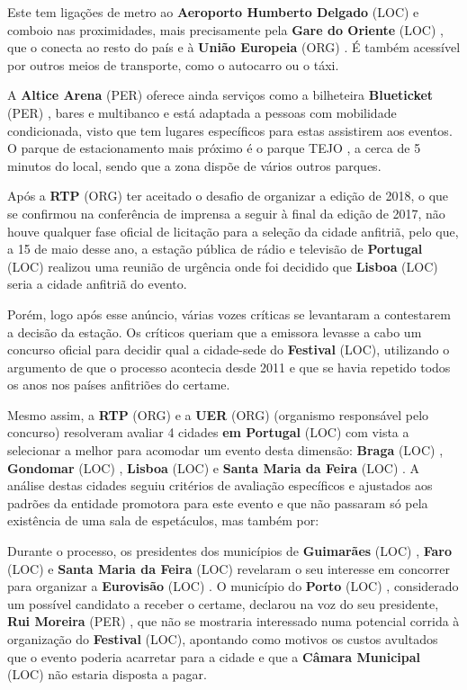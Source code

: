 \documentclass[12pt,a4paper]{article}
\begin{document}
Este tem ligações de metro ao \textbf{Aeroporto Humberto Delgado} (LOC) e comboio nas proximidades, mais precisamente pela \textbf{Gare do Oriente} (LOC) , que o conecta ao resto do país e à \textbf{União Europeia} (ORG) . É também acessível por outros meios de transporte, como o autocarro ou o táxi.

A \textbf{Altice Arena} (PER) oferece ainda serviços como a bilheteira \textbf{Blueticket} (PER) , bares e multibanco e está adaptada a pessoas com mobilidade condicionada, visto que tem lugares específicos para estas assistirem aos eventos. O parque de estacionamento mais próximo é o parque TEJO , a cerca de 5 minutos do local, sendo que a zona dispõe de vários outros parques.

Após a \textbf{RTP} (ORG) ter aceitado o desafio de organizar a edição de 2018, o que se confirmou na conferência de imprensa a seguir à final da edição de 2017, não houve qualquer fase oficial de licitação para a seleção da cidade anfitriã, pelo que, a 15 de maio desse ano, a estação pública de rádio e televisão de \textbf{Portugal} (LOC) realizou uma reunião de urgência onde foi decidido que \textbf{Lisboa} (LOC) seria a cidade anfitriã do evento.

Porém, logo após esse anúncio, várias vozes críticas se levantaram a contestarem a decisão da estação. Os críticos queriam que a emissora levasse a cabo um concurso oficial para decidir qual a cidade-sede do \textbf{Festival} (LOC), utilizando o argumento de que o processo acontecia desde 2011 e que se havia repetido todos os anos nos países anfitriões do certame.

Mesmo assim, a \textbf{RTP} (ORG) e a \textbf{UER} (ORG) (organismo responsável pelo concurso) resolveram avaliar 4 cidades \textbf{em Portugal} (LOC) com vista a selecionar a melhor para acomodar um evento desta dimensão: \textbf{Braga} (LOC) , \textbf{Gondomar} (LOC) , \textbf{Lisboa} (LOC) e \textbf{Santa Maria da Feira} (LOC) . A análise destas cidades seguiu critérios de avaliação específicos e ajustados aos padrões da entidade promotora para este evento e que não passaram só pela existência de uma sala de espetáculos, mas também por:

Durante o processo, os presidentes dos municípios de \textbf{Guimarães} (LOC) , \textbf{Faro} (LOC) e \textbf{Santa Maria da Feira} (LOC) revelaram o seu interesse em concorrer para organizar a \textbf{Eurovisão} (LOC) . O município do \textbf{Porto} (LOC) , considerado um possível candidato a receber o certame, declarou na voz do seu presidente, \textbf{Rui Moreira} (PER) , que não se mostraria interessado numa potencial corrida à organização do \textbf{Festival} (LOC), apontando como motivos os custos avultados que o evento poderia acarretar para a cidade e que a \textbf{Câmara Municipal} (LOC) não estaria disposta a pagar.
\end{document}
